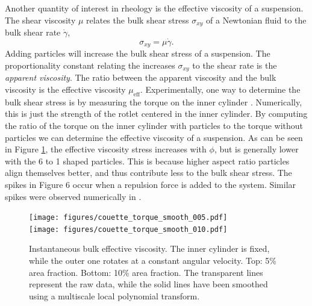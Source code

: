 \documentclass[preprint, 10pt]{elsarticle}
\begin{document}
Another quantity of interest in rheology is the effective viscosity of a suspension. The shear viscosity $\mu$ relates the bulk shear stress $\sigma_{xy}$ of a Newtonian fluid to the bulk shear rate $\dot{\gamma}$,
\[ \sigma_{xy} = \mu\dot{\gamma}.\]
 Adding particles will increase the bulk shear stress of a suspension. The proportionality constant relating the increases $\sigma_{xy}$ to the shear rate is the \textit{apparent viscosity}. The ratio between the apparent viscosity and the bulk viscosity is the effective viscosity $\mu_{\text{eff}}$. Experimentally, one way to determine the bulk shear stress is by measuring the torque on the inner cylinder \cite{Koos2012}. Numerically, this is just the strength of the rotlet centered in the inner cylinder. By computing the ratio of the torque on the inner cylinder with particles to the torque without particles we can determine the effective viscosity of a suspension.  As can be seen in Figure
\ref{fig:torque}, the effective viscosity stress increases with $\phi$, but is
generally lower with the 6 to 1 shaped particles. This is because higher aspect ratio particles align themselves better, and thus contribute less to the bulk shear stress. The spikes in Figure 6 occur
when a repulsion force is added to the system. Similar spikes were observed numerically in
\cite{Lu2017}.
\begin{figure}[!h]
\begin{center}
\texttt{[image: figures/couette\_torque\_smooth\_005.pdf]}\\
\texttt{[image: figures/couette\_torque\_smooth\_010.pdf]}\\
\end{center}
\caption{Instantaneous bulk effective viscosity. The inner
cylinder is fixed, while the outer one rotates at a constant angular velocity. Top: 5\% area fraction. Bottom: 10\% area fraction. The transparent lines represent the raw data, while the solid lines have been smoothed using a multiscale local polynomial transform. }\label{fig:torque}
\end{figure} 
\end{document}
